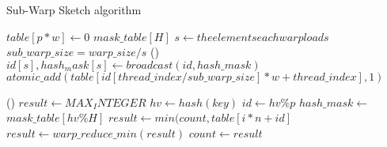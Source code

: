 \documentclass[conference]{IEEEtran}
\begin{document}
\begin{algorithm}
    \DontPrintSemicolon
    \caption{Sub-Warp Sketch algorithm}
    $table[p * w] \longleftarrow 0$\;
    $mask\_table[H]$\;
    $s \longleftarrow the elements each warp loads$\;
    $sub\_warp\_size = warp\_size / s $\;
\Fn(){}
{
    {
            $id[s], hash_mask[s] \leftarrow broadcast(id, hash\_mask)$\;
            {
                {
                    $atomic\_add(table[id[thread\_index / sub\_warp\_size] * w + thread\_index], 1)$
                }
            }
    }
}

\Fn(){}
{%
    {
        $result \leftarrow MAX_INTEGER$\;
            $hv \leftarrow hash(key)$\;
            $id \leftarrow hv \% p$
            $hash\_mask \leftarrow$ $mask\_table[hv \% H]$
            {
                {
                    $result \leftarrow min(count, table[i * n + id]$
                }
            }
        $result \leftarrow warp\_reduce\_min(result)$\;
        {
            $count \leftarrow result$
        }
    }
}

\end{algorithm}
\end{document}
